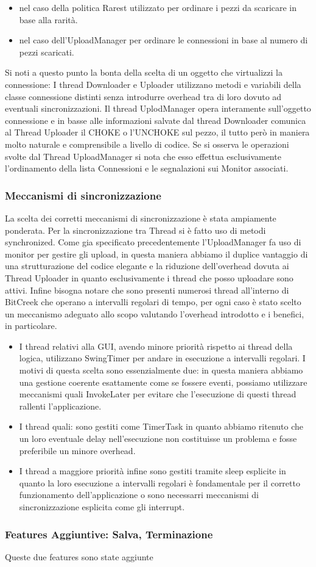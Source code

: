 \begin{itemize}
\item nel caso della politica Rarest utilizzato per ordinare i pezzi da scaricare in base alla rarit\`a.
\item nel caso dell'UploadManager per ordinare le connessioni in base al numero di pezzi scaricati.
\end{itemize}
Si noti a questo punto la bonta della scelta di un oggetto che virtualizzi la connessione: I thread Downloader e Uploader utilizzano metodi e variabili della classe connessione distinti senza introdurre overhead tra di loro dovuto ad eventuali sincronizzazioni. Il thread UplodManager opera interamente sull'oggetto connessione e in basse alle informazioni salvate dal thread Downloader comunica al Thread Uploader il CHOKE o l'UNCHOKE sul pezzo, il tutto per\`o in maniera molto naturale e comprensibile a livello di codice. Se si osserva le operazioni svolte dal Thread UploadManager si nota che esso effettua esclusivamente l'ordinamento della lista Connessioni e le segnalazioni sui Monitor associati.

\subsubsection{Meccanismi di sincronizzazione}

La scelta dei corretti meccanismi di sincronizzazione \`e stata ampiamente ponderata. Per la sincronizzazione tra Thread si \`e fatto uso di metodi synchronized. Come gia specificato precedentemente l'UploadManager fa uso di monitor per gestire gli upload, in questa  maniera abbiamo il duplice vantaggio di una strutturazione del codice elegante e la riduzione dell'overhead dovuta ai Thread Uploader in quanto esclusivamente i thread che posso uploadare sono attivi.
Infine bisogna notare che sono presenti numerosi thread all'interno di BitCreek che operano a intervalli regolari di tempo, per ogni caso \`e stato scelto un meccanismo adeguato allo scopo valutando l'overhead introdotto e i benefici, in particolare.
\begin{itemize}
\item I thread relativi alla GUI, avendo minore priorit\`a rispetto ai thread della logica, utilizzano SwingTimer per andare in esecuzione a intervalli regolari. I motivi di questa scelta sono essenzialmente due: in questa maniera abbiamo una gestione coerente esattamente come se fossere eventi, possiamo utilizzare meccanismi quali InvokeLater per evitare che l'esecuzione di questi thread rallenti l'applicazione. \citep{site:rif.1}
\item I thread quali: sono gestiti come TimerTask in quanto abbiamo ritenuto che un loro eventuale delay nell'esecuzione non costituisse un problema e fosse preferibile un minore overhead.
\item I thread a maggiore priorit\`a infine sono gestiti tramite sleep esplicite in quanto la loro esecuzione a intervalli regolari \`e fondamentale per il corretto funzionamento dell'applicazione o sono necessarri meccanismi di sincronizzazione esplicita come gli interrupt.
\end{itemize}

\subsubsection{Features Aggiuntive: Salva, Terminazione}

Queste due features sono state aggiunte
